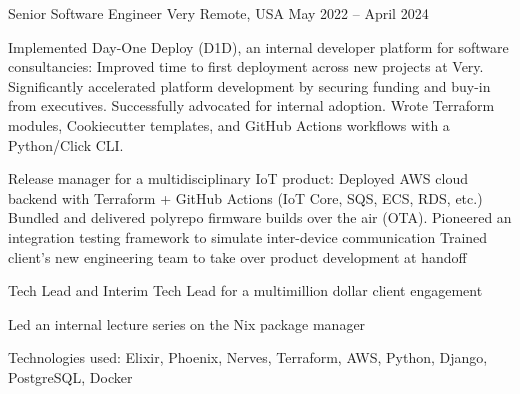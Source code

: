
\begin{cventries}

  \cventry
  {Senior Software Engineer} %
  {Very} %
  {Remote, USA} %
  {May 2022 -- April 2024} %
  {
    \begin{cvitems}
      \item Implemented Day-One Deploy (D1D), an internal developer platform for software
        consultancies:
        \subitem Improved time to first deployment across new projects at Very.
        \subitem Significantly accelerated platform development by securing
        funding and buy-in from executives.
        \subitem Successfully advocated for internal adoption.
        \subitem Wrote Terraform modules, Cookiecutter templates, and GitHub
        Actions workflows with a Python/Click CLI.
      \item Release manager for a multidisciplinary IoT product:
        \subitem Deployed AWS cloud backend with Terraform + GitHub Actions (IoT
        Core, SQS, ECS, RDS, etc.)
        \subitem Bundled and delivered polyrepo firmware builds over the air (OTA).
        \subitem Pioneered an integration testing framework to simulate
        inter-device communication
        \subitem Trained client's new engineering team to take over product
        development at handoff
      \item Tech Lead and Interim Tech Lead for a multimillion dollar client
        engagement
      \item Led an internal lecture series on the Nix package manager
      \item Technologies used: Elixir, Phoenix, Nerves, Terraform, AWS, Python,
        Django, PostgreSQL, Docker
      \end{cvitems}
    }


\end{cventries}
